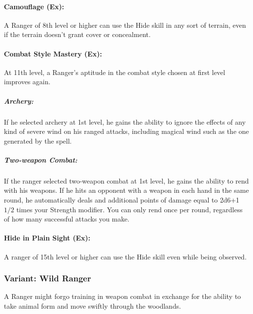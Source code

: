 \paragraph{Camouflage (Ex):}
A Ranger of 8th level or higher can use the Hide skill in any sort of terrain, even if the terrain doesn't grant cover or concealment.

\paragraph{Combat Style Mastery (Ex):}
At 11th level, a Ranger's aptitude in the combat style chosen at first level improves again.

\subparagraph{Archery:} If he selected archery at 1st level, he gains the ability to ignore the effects of any kind of severe wind on his ranged attacks, including magical wind such as the one generated by the  spell.

\subparagraph{Two-weapon Combat:} If the ranger selected two-weapon combat at 1st level, he gains the ability to rend with his weapons.
If he hits an opponent with a weapon in each hand in the same round, he automatically deals and additional points of damage equal to 2d6+1 $1/2$ times your Strength modifier. You can only rend once per round, regardless of how many successful attacks you make.

\paragraph{Hide in Plain Sight (Ex):}
A ranger of 15th level or higher can use the Hide skill even while being observed.

% 
% 

\subsubsection{Variant: Wild Ranger}

A Ranger might forgo training in weapon combat in exchange for the ability to take animal form and move swiftly through the woodlands.

